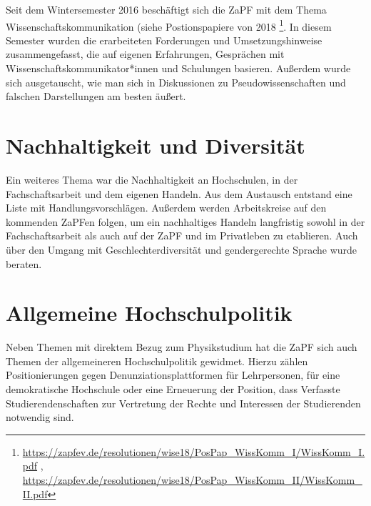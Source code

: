 Seit dem Wintersemester 2016 beschäftigt sich die ZaPF mit dem Thema  Wissenschaftskommunikation (siehe Postionspapiere von 2018 \footnote{\url{https://zapfev.de/resolutionen/wise18/PosPap_WissKomm_I/WissKomm_I.pdf} , \url{https://zapfev.de/resolutionen/wise18/PosPap_WissKomm_II/WissKomm_II.pdf}}. In diesem Semester wurden die erarbeiteten Forderungen und Umsetzungshinweise  zusammengefasst, die auf eigenen Erfahrungen, Gesprächen mit Wissenschaftskommunikator*innen und Schulungen basieren. Außerdem wurde sich ausgetauscht, wie man sich in Diskussionen zu Pseudowissenschaften und falschen Darstellungen am besten äußert.

\section*{Nachhaltigkeit und Diversität}

Ein weiteres Thema war die Nachhaltigkeit an Hochschulen, in der Fachschaftsarbeit und dem eigenen Handeln. Aus dem Austausch entstand eine Liste mit Handlungsvorschlägen. Außerdem werden Arbeitskreise auf den kommenden ZaPFen folgen, um ein nachhaltiges Handeln langfristig sowohl in der Fachschaftsarbeit als auch auf der ZaPF und im Privatleben zu etablieren. Auch über den Umgang mit Geschlechterdiversität und gendergerechte Sprache wurde beraten.

\section*{Allgemeine Hochschulpolitik}

Neben Themen mit direktem Bezug zum Physikstudium hat die ZaPF sich auch Themen der allgemeineren Hochschulpolitik gewidmet. Hierzu zählen Positionierungen gegen Denunziationsplattformen für Lehrpersonen, für eine demokratische Hochschule oder eine Erneuerung der Position, dass Verfasste Studierendenschaften zur Vertretung der Rechte und Interessen der Studierenden notwendig sind.

